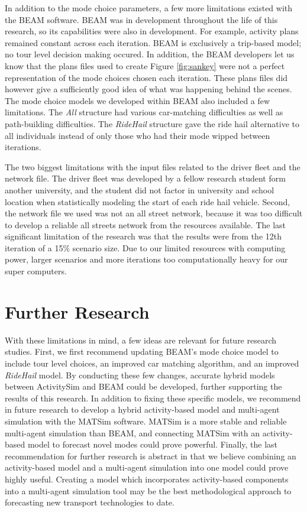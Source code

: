 \documentclass[12pt, oneside, openright]{byuthesis}
\begin{document}
In addition to the mode choice parameters, a few more limitations existed with the BEAM software. BEAM was in development throughout the life of this research, so its capabilities were also in development. For example, activity plans remained constant across each iteration. BEAM is exclusively a trip-based model; no tour level decision making occured. In addition, the BEAM developers let us know that the plans files used to create Figure \ref{fig:sankey} were not a perfect representation of the mode choices chosen each iteration. These plans files did however give a sufficiently good idea of what was happening behind the scenes. The mode choice models we developed within BEAM also included a few limitations. The \emph{All} structure had various car-matching difficulties as well as path-building difficulties. The \emph{RideHail} structure gave the ride hail alternative to all individuals instead of only those who had their mode wipped between iterations.

The two biggest limitations with the input files related to the driver fleet and the network file. The driver fleet was developed by a fellow research student form another university, and the student did not factor in university and school location when statistically modeling the start of each ride hail vehicle. Second, the network file we used was not an all street network, because it was too difficult to develop a reliable all streets network from the resources available. The last significant limitation of the research was that the results were from the 12th iteration of a 15\% scenario size. Due to our limited resources with computing power, larger scenarios and more iterations too computationally heavy for our super computers.

\hypertarget{further-research}{%
\section{Further Research}\label{further-research}}

With these limitations in mind, a few ideas are relevant for future research studies. First, we first recommend updating BEAM's mode choice model to include tour level choices, an improved car matching algorithm, and an improved \emph{RideHail} model. By conducting these few changes, accurate hybrid models between ActivitySim and BEAM could be developed, further supporting the results of this research. In addition to fixing these specific models, we recommend in future research to develop a hybrid activity-based model and multi-agent simulation with the MATSim software. MATSim is a more stable and reliable multi-agent simulation than BEAM, and connecting MATSim with an activity-based model to forecast novel modes could prove powerful. Finally, the last recommendation for further research is abstract in that we believe combining an activity-based model and a multi-agent simulation into one model could prove highly useful. Creating a model which incorporates activity-based components into a multi-agent simulation tool may be the best methodological approach to forecasting new transport technologies to date.
\end{document}

